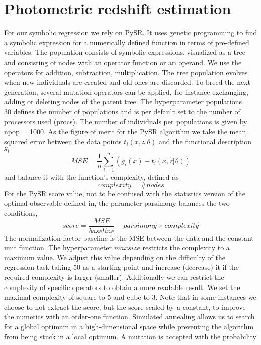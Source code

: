 \section{Photometric redshift estimation}

For our symbolic regression we rely on PySR\cite{pysr}. It uses genetic programming to find a symbolic expression for a numerically defined function in terms of pre-defined variables. The population consists of symbolic expressions, visualized as a tree and consisting of nodes with an operator function or an operand. We use the operators for addition, subtraction, multiplication. The tree population evolves when new individuals are created and old ones are discarded. To breed the next generation, several mutation operators can be applied, for instance exchanging, adding or deleting nodes of the parent tree. The hyperparameter populations = 30 defines the number of populations and is per default set to the number of processors used (procs). The number of individuals per populations is given by npop = 1000. As the figure of merit for the PySR algorithm we take the mean squared error between the data points $t_{i}(x, z|\theta)$ and the functional description $g_i$
\begin{equation}
	MSE = \frac{1}{n} \sum_{i=1}^{n} \left( g_{i}\left(x\right) - t_{i}(x, z|\theta) \right)
\end{equation}
and balance it with the function’s complexity, defined as
\begin{equation}
	complexity = \# nodes
\end{equation}
For the PySR score value, not to be confused with the statistics version of the optimal observable defined in, the parameter parsimony balances the two conditions,
\begin{equation}
	score = \frac{MSE}{baseline} + parsimony \times complexity
\end{equation}
The normalization factor baseline is the MSE between the data and the constant unit function. The hyperparameter $maxsize$ restricts the complexity to a maximum value. We adjust this value depending on the difficulty of the regression task taking 50 as a starting point and increase (decrease) it if the required complexity is larger (smaller). Additionally we can restrict the complexity of specific operators to obtain a more readable result. We set the maximal complexity of square to 5 and cube to 3. Note that in some instances we choose to not extract the score, but the score scaled by a constant, to improve the numerics with an order-one function. Simulated annealing allows us to search for a global optimum in a high-dimensional space while preventing the algorithm from being stuck in a local optimum. A mutation is accepted with the probability
